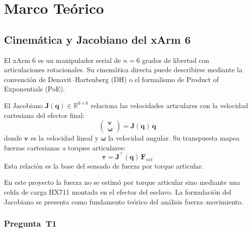 \documentclass[journal,10pt,twoside]{IEEEtran}
\begin{document}
\section{Marco Teórico}
\label{sec:background}

\subsection{Cinemática y Jacobiano del xArm 6}

El xArm 6 es un manipulador serial de $n = 6$ grados de libertad con articulaciones rotacionales. Su cinemática directa
puede describirse mediante la convención de Denavit--Hartenberg (DH) o el formalismo de Product of Exponentials (PoE).

\begin{theorybox}
El Jacobiano $\bm{J}(\bm{q}) \in \mathbb{R}^{6\times6}$ relaciona las velocidades articulares con la velocidad 
cartesiana del efector final:
\[
\begin{pmatrix} \bm{v} \\ \bm{\omega} \end{pmatrix} = \bm{J}(\bm{q})\,\dot{\bm{q}}
\]
donde $\bm{v}$ es la velocidad lineal y $\bm{\omega}$ la velocidad angular. Su transpuesta mapea fuerzas 
cartesianas a torques articulares:
\[
\bm{\tau} = \bm{J}^\top(\bm{q})\,\bm{F}_{ext}
\]
Esta relación es la base del sensado de fuerza por torque articular.
\end{theorybox}

En este proyecto la fuerza no se estimó por torque articular sino mediante una celda de carga HX711 
montada en el efector del esclavo. La formulación del 
Jacobiano se presenta como fundamento teórico del análisis fuerza--movimiento.

\subsubsection*{Pregunta~T1}
\end{document}
